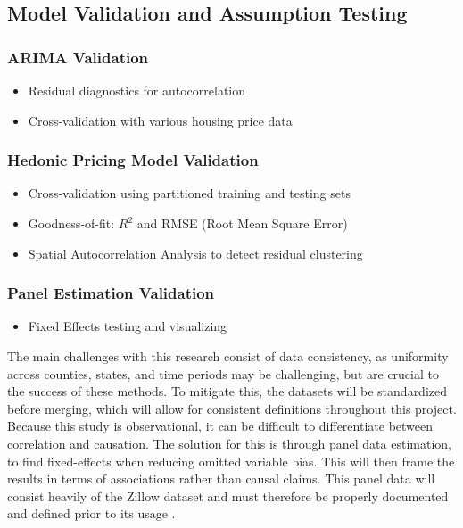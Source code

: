 \documentclass[journal,article,submit,pdftex,moreauthors]{Definitions/mdpi}
\begin{document}
\subsection{Model Validation and Assumption Testing}

\subsubsection*{ARIMA Validation}
\begin{itemize}
    \item Residual diagnostics for autocorrelation
    \item Cross-validation with various housing price data
\end{itemize}

\subsubsection*{Hedonic Pricing Model Validation}
\begin{itemize}
    \item Cross-validation using partitioned training and testing sets
    \item Goodness-of-fit: $R^2$ and RMSE (Root Mean Square Error)
    \item Spatial Autocorrelation Analysis to detect residual clustering \citep{aladwan_2019_hedonic}
\end{itemize}

\subsubsection*{Panel Estimation Validation}
\begin{itemize}
    \item Fixed Effects testing and visualizing \citep{torresreyna_2010_getting} 
\end{itemize}

The main challenges with this research consist of data consistency, as uniformity across counties, states, and time periods may be challenging, but are crucial to the success of these methods. To mitigate this, the datasets will be standardized before merging, which will allow for consistent definitions throughout this project. Because this study is observational, it can be difficult to differentiate between correlation and causation. The solution for this is through panel data estimation, to find fixed-effects when reducing omitted variable bias. This will then frame the results in terms of associations rather than causal claims. This panel data will consist heavily of the Zillow dataset and must therefore be properly documented and defined prior to its usage \citep{zillow_2024_housing}.
\end{document}
